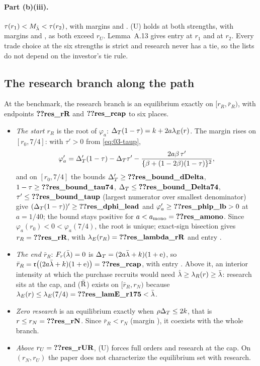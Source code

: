 \paragraph{Part (b)(iii).} \(\tau(r_1)<M_{\bar\lambda}<\tau(r_2)\), with margins  and
. (U) holds at both strengths, with margins  and
, as both exceed \(r_U\). Lemma~A.13 gives entry  at \(r_1\) and
 at \(r_2\). Every trade choice at the six strengths is strict and research never has a tie, so the lists
do not depend on the investor's tie rule.

\subsection{The research branch along the path}\label{sec:09_research-branch}

At the benchmark, the research branch is an equilibrium exactly on \([r_R,\bar r_R)\), with endpoints \(\reg{res_rR}\) and \(\reg{res_rcap}\) to six places.
\begin{itemize}[leftmargin=2em]
\item \emph{The start \(r_R\)} is the root of \(\varphi_a\): \(\Delta_T(1-\tau)=k+2a\lambda_E(r)\). The margin rises on
\([r_0,7/4]\): with \(\tau'>0\) from \eqref{eq:03-taup},
\[
\varphi_a'=\Delta_T'(1-\tau)-\Delta_T\tau'-\frac{2a\beta\,\tau'}{\{\beta+(1-2\beta)(1-\tau)\}^2},
\]
and on \([r_0,7/4]\) the bounds \(\DT'\ge\reg{res_bound_dDelta}\), \(1-\tau\ge\reg{res_bound_tau74}\),
\(\DT\le\reg{res_bound_Delta74}\), \(\tau'\le\reg{res_bound_taup}\) (largest numerator over smallest denominator) give
\((\DT(1-\tau))'\ge\reg{res_dphi_lead}\) and \(\varphi_a'\ge\reg{res_phip_lb}>0\) at \(a=1/40\); the bound stays positive for
\(a<a_{\rm mono}=\reg{res_amono}\). Since \(\varphi_a(r_0)<0<\varphi_a(7/4)\), the root is unique; exact-sign bisection gives
\(r_R=\reg{res_rR}\), with \(\lambda_E(r_R)=\reg{res_lambda_rR}\) and entry .
\item \emph{The end \(\bar r_R\)}: \(F_r(\bar\lambda)=0\) is \(\Delta_T=(2a\bar\lambda+k)(1+\mathrm{e})\), so \(\bar r_R=\mathfrak r\bigl((2a\lb+k)(1+\eu)\bigr)
=\reg{res_rcap}\), with entry . Above it, an interior intensity at which the purchase recruits would need
\(\hat\lambda\ge\lambda_R(r)\ge\bar\lambda\): research sits at the cap, and (\(\bar{\rm R}\)) exists on \([\bar r_R,r_N)\) because
\(\lambda_E(r)\le\lambda_E(7/4)=\reg{res_lamE_r175}<\lb\).
\item \emph{Zero research} is an equilibrium exactly when \(\rho\Delta_T\le2k\), that is \(r\le r_N=\reg{res_rN}\). Since
\(\bar r_R<r_N\) (margin ), it coexists with the whole branch.
\item \emph{Above \(r_U=\reg{res_rUR}\)}, (U) forces full orders and research at the cap. On \((r_N,r_U)\) the paper does not
characterize the equilibrium set with research.
\end{itemize}

